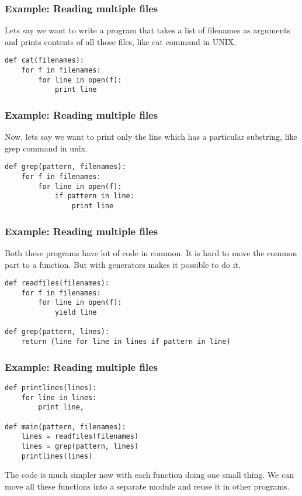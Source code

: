 \begin{frame}[fragile]\frametitle{Example: Reading multiple files}
Lets say we want to write a program that takes a list of filenames as arguments and prints contents of all those files, like cat command in UNIX.
\begin{lstlisting}
def cat(filenames):
    for f in filenames:
        for line in open(f):
            print line
\end{lstlisting}

\end{frame}

\begin{frame}[fragile]\frametitle{Example: Reading multiple files}
Now, lets say we want to print only the line which has a particular substring, like grep command in unix.
\begin{lstlisting}
def grep(pattern, filenames):
    for f in filenames:
        for line in open(f):
            if pattern in line:
                print line
\end{lstlisting}

\end{frame}

\begin{frame}[fragile]\frametitle{Example: Reading multiple files}
Both these programs have lot of code in common. It is hard to move the common part to a function. But with generators makes it possible to do it.
\begin{lstlisting}
def readfiles(filenames):
    for f in filenames:
        for line in open(f):
            yield line

def grep(pattern, lines):
    return (line for line in lines if pattern in line)
\end{lstlisting}

\end{frame}

\begin{frame}[fragile]\frametitle{Example: Reading multiple files}

\begin{lstlisting}
def printlines(lines):
    for line in lines:
        print line,

def main(pattern, filenames):
    lines = readfiles(filenames)
    lines = grep(pattern, lines)
    printlines(lines)
\end{lstlisting}
The code is much simpler now with each function doing one small thing. We can move all these functions into a separate module and reuse it in other programs.
\end{frame}


